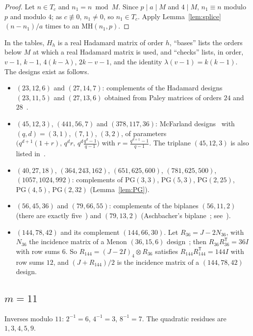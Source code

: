\documentclass[10pt]{article}
\theoremstyle{remark}
\newcommand{\MH}{\mathrm{MH}}
\newcommand{\tr}{^{\mathsf T}}
\newcommand{\PG}{\mathrm{PG}}
\begin{document}
\begin{proof}
Let $n\in T_c$ and $n_1=n\bmod M$. Since $p\mid a\mid M$ and $4\mid M$, $n_1\equiv n$ modulo $p$ and modulo $4$; as $c\not\equiv0$, $n_1\ne0$, so $n_1\in T_c$. Apply Lemma~\ref{lem:splice} $(n-n_1)/a$ times to an $\MH(n_1,p)$.
\end{proof}

In the tables, $H_h$ is a real Hadamard matrix of order $h$, ``bases'' lists the orders below $M$ at which a real Hadamard matrix is used, and ``checks'' lists, in order, $v-1$, $k-1$, $4(k-\lambda)$, $2k-v-1$, and the identity $\lambda(v-1)=k(k-1)$. The designs exist as follows.
\begin{itemize}
\item $(23,12,6)$ and $(27,14,7)$: complements of the Hadamard designs $(23,11,5)$ and $(27,13,6)$ obtained from Paley matrices of orders $24$ and $28$~\cite{Pa33}.
\item $(45,12,3)$, $(441,56,7)$ and $(378,117,36)$: McFarland designs~\cite{McF73} with $(q,d)=(3,1)$, $(7,1)$, $(3,2)$, of parameters $\bigl(q^{d+1}(1+r),\,q^dr,\,q^d\tfrac{q^d-1}{q-1}\bigr)$ with $r=\tfrac{q^{d+1}-1}{q-1}$. The triplane $(45,12,3)$ is also listed in~\cite{R01}.
\item $(40,27,18)$, $(364,243,162)$, $(651,625,600)$, $(781,625,500)$, $(1057,1024,992)$: complements of $\PG(3,3)$, $\PG(5,3)$, $\PG(2,25)$, $\PG(4,5)$, $\PG(2,32)$ (Lemma~\ref{lem:PG}).
\item $(56,45,36)$ and $(79,66,55)$: complements of the biplanes $(56,11,2)$ (there are exactly five~\cite{KO08}) and $(79,13,2)$ (Aschbacher's biplane~\cite{As71}; see~\cite{ADP20}).
\item $(144,78,42)$ and its complement $(144,66,30)$. Let $R_{36}=J-2N_{36}$, with $N_{36}$ the incidence matrix of a Menon $(36,15,6)$ design~\cite{Me62,IT07}; then $R_{36}R_{36}\tr=36I$ with row sums $6$. So $R_{144}=(J-2I)_4\otimes R_{36}$ satisfies $R_{144}R_{144}\tr=144I$ with row sums $12$, and $(J+R_{144})/2$ is the incidence matrix of a $(144,78,42)$ design.
\end{itemize}

\subsection{\texorpdfstring{$m=11$}{m = 11}}
Inverses modulo $11$: $2^{-1}=6$, $4^{-1}=3$, $8^{-1}=7$. The quadratic residues are $1,3,4,5,9$.
\end{document}
